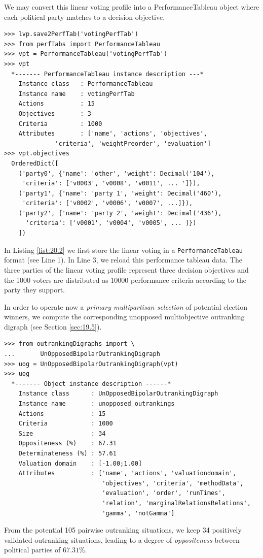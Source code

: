 We may convert this linear voting profile into a PerformanceTableau object where each political party matches to a decision objective.
\begin{lstlisting}[caption={Converting a voting profile into a performance tableau},label=list:20.2]
>>> lvp.save2PerfTab('votingPerfTab')
>>> from perfTabs import PerformanceTableau
>>> vpt = PerformanceTableau('votingPerfTab')
>>> vpt
  *------- PerformanceTableau instance description ---*
    Instance class   : PerformanceTableau
    Instance name    : votingPerfTab
    Actions          : 15
    Objectives       : 3
    Criteria         : 1000
    Attributes       : ['name', 'actions', 'objectives',
              'criteria', 'weightPreorder', 'evaluation']
>>> vpt.objectives
  OrderedDict([
    ('party0', {'name': 'other', 'weight': Decimal('104'),
     'criteria': ['v0003', 'v0008', 'v0011', ... ']}),
    ('party1', {'name': 'party 1', 'weight': Decimal('460'),
     'criteria': ['v0002', 'v0006', 'v0007', ...]}),
    ('party2', {'name': 'party 2', 'weight': Decimal('436'),
      'criteria': ['v0001', 'v0004', 'v0005', ... ]})
    ])
\end{lstlisting}
In Listing \ref{list:20.2} we first store the linear voting in a \texttt{PerformanceTableau} format (see Line 1). In Line 3, we reload this performance tableau data. The three parties of the linear voting profile represent three decision objectives and the 1000 voters are distributed as 10000 performance criteria according to the party they support.


In order to operate now a \emph{primary multipartisan selection} of potential election winners, we compute the corresponding unopposed multiobjective outranking digraph (see Section \ref{sec:19.5}).
\begin{lstlisting}[caption={Computing unopposed multiobjective outranking situations},label=list:20.3]
>>> from outrankingDigraphs import \
...       UnOpposedBipolarOutrankingDigraph
>>> uog = UnOpposedBipolarOutrankingDigraph(vpt)
>>> uog
  *------- Object instance description ------*
    Instance class      : UnOpposedBipolarOutrankingDigraph
    Instance name       : unopposed_outrankings
    Actions             : 15
    Criteria            : 1000
    Size                : 34
    Oppositeness (%)    : 67.31
    Determinateness (%) : 57.61
    Valuation domain    : [-1.00;1.00]
    Attributes          : ['name', 'actions', 'valuationdomain',
                           'objectives', 'criteria', 'methodData',
                           'evaluation', 'order', 'runTimes',
                           'relation', 'marginalRelationsRelations',
                           'gamma', 'notGamma']
\end{lstlisting}
From the potential 105 pairwise outranking situations, we keep 34 positively validated outranking situations, leading to a degree of \emph{oppositeness} between political parties of $67.31\%$.

